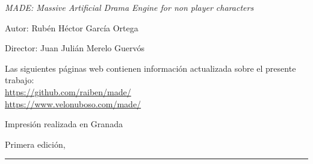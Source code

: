 
\thispagestyle{empty}

\hfill

\vfill

\medskip


\noindent
\textit{
MADE: Massive Artificial Drama Engine for non player characters
}




Autor: Rubén Héctor García Ortega

Director: Juan Julián Merelo Guervós




\vfill

\vfill

\noindent
Las siguientes páginas web contienen información actualizada sobre el presente trabajo: \\
\url{https://github.com/raiben/made/}\\
\url{https://www.velonuboso.com/made/}


\noindent
Impresión realizada en Granada

\noindent
Primera edición, 
\monthname \ \the\year

\vspace{1cm}
\hrule
\bigskip

\cleardoublepage

%
%
%
%
%
%

